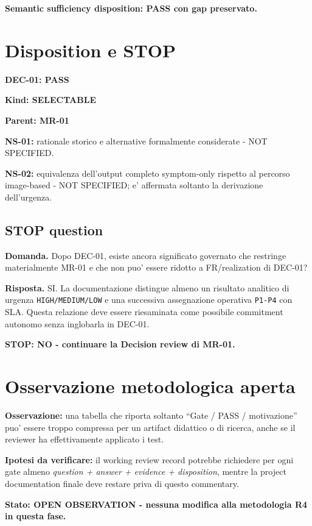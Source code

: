 \documentclass[11pt,a4paper]{article}
\begin{document}
\textbf{Semantic sufficiency disposition: PASS con gap preservato.}

\section{Disposition e STOP}

\begin{ddtacore}[title={DEC-01 disposition}]
\textbf{DEC-01: PASS}\par
\textbf{Kind: SELECTABLE}\par
\textbf{Parent: MR-01}\par
\textbf{NS-01:} rationale storico e alternative formalmente considerate - NOT SPECIFIED.\par
\textbf{NS-02:} equivalenza dell'output completo symptom-only rispetto al percorso image-based - NOT SPECIFIED; e' affermata soltanto la derivazione dell'urgenza.
\end{ddtacore}

\subsection{STOP question}
\begin{ddtacheck}
\textbf{Domanda.} Dopo DEC-01, esiste ancora significato governato che restringe materialmente MR-01 e che non puo' essere ridotto a FR/realization di DEC-01?
\end{ddtacheck}

\textbf{Risposta.} SI. La documentazione distingue almeno un risultato analitico di urgenza \texttt{HIGH/MEDIUM/LOW} e una successiva assegnazione operativa \texttt{P1-P4} con SLA. Questa relazione deve essere riesaminata come possibile commitment autonomo senza inglobarla in DEC-01.

\textbf{STOP: NO - continuare la Decision review di MR-01.}

\section{Osservazione metodologica aperta}

\begin{ddtaworking}[title={OBS-DDTA-DERMA-01 - Gate visibility}]
\textbf{Osservazione:} una tabella che riporta soltanto ``Gate / PASS / motivazione'' puo' essere troppo compressa per un artifact didattico o di ricerca, anche se il reviewer ha effettivamente applicato i test.

\textbf{Ipotesi da verificare:} il working review record potrebbe richiedere per ogni gate almeno \emph{question + answer + evidence + disposition}, mentre la project documentation finale deve restare priva di questo commentary.

\textbf{Stato: OPEN OBSERVATION - nessuna modifica alla metodologia R4 in questa fase.}
\end{ddtaworking}
\end{document}

